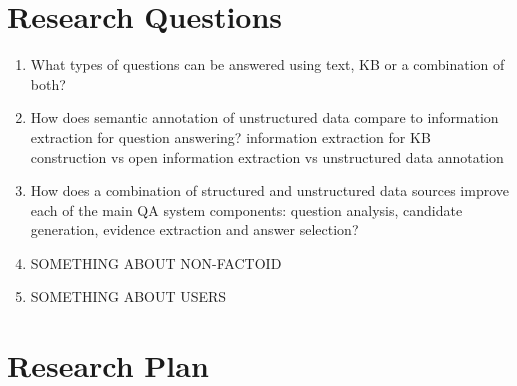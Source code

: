 

\section{Research Questions}

\begin{enumerate}
\item What types of questions can be answered using text, KB or a combination of both?
\item How does semantic annotation of unstructured data compare to information extraction for question answering?
information extraction for KB construction vs open information extraction vs unstructured data annotation
\item How does a combination of structured and unstructured data sources improve each of the main QA system components: question analysis, candidate generation, evidence extraction and answer selection?
\item SOMETHING ABOUT NON-FACTOID
\item SOMETHING ABOUT USERS
\end{enumerate}


\section{Research Plan}

